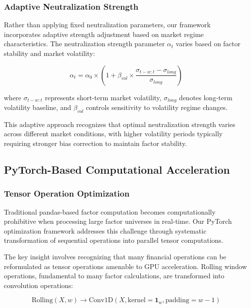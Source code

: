 \documentclass[conference]{IEEEtran}
\begin{document}
\subsubsection{Adaptive Neutralization Strength}

Rather than applying fixed neutralization parameters, our framework incorporates adaptive strength adjustment based on market regime characteristics. The neutralization strength parameter $\alpha_t$ varies based on factor stability and market volatility:

\begin{equation}
\alpha_t = \alpha_0 \times \left(1 + \beta_{vol} \times \frac{\sigma_{t-w:t} - \sigma_{long}}{\sigma_{long}}\right)
\end{equation}

where $\sigma_{t-w:t}$ represents short-term market volatility, $\sigma_{long}$ denotes long-term volatility baseline, and $\beta_{vol}$ controls sensitivity to volatility regime changes.

This adaptive approach recognizes that optimal neutralization strength varies across different market conditions, with higher volatility periods typically requiring stronger bias correction to maintain factor stability.

\subsection{PyTorch-Based Computational Acceleration}

\subsubsection{Tensor Operation Optimization}

Traditional pandas-based factor computation becomes computationally prohibitive when processing large factor universes in real-time. Our PyTorch optimization framework addresses this challenge through systematic transformation of sequential operations into parallel tensor computations.

The key insight involves recognizing that many financial operations can be reformulated as tensor operations amenable to GPU acceleration. Rolling window operations, fundamental to many factor calculations, are transformed into convolution operations:

\begin{equation}
\text{Rolling}(X, w) \rightarrow \text{Conv1D}(X, \text{kernel}=\mathbf{1}_w, \text{padding}=w-1)
\end{equation}
\end{document}

